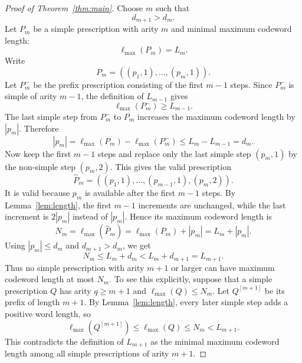 \documentclass[10pt,a4paper]{amsart}
\newcommand{\ellmax}{\ell_{\max}}
\begin{document}
\begin{proof}[Proof of Theorem~\ref{thm:main}]
Choose $m$ such that
\begin{equation}
d_{m+1}>d_m.
\end{equation}
Let $P_m$ be a simple prescription with arity $m$ and minimal maximum codeword length:
\begin{equation}
\ellmax(P_m)=L_m.
\end{equation}
Write
\begin{equation}
P_m=((p_1,1),\ldots,(p_m,1)).
\end{equation}
Let $P_m^-$ be the prefix prescription consisting of the first $m-1$ steps. Since $P_m^-$ is simple of arity $m-1$, the definition of $L_{m-1}$ gives
\begin{equation}
\ellmax(P_m^-)\geq L_{m-1}.
\end{equation}
The last simple step from $P_m^-$ to $P_m$ increases the maximum codeword length by $|p_m|$. Therefore
\begin{equation}
|p_m|=\ellmax(P_m)-\ellmax(P_m^-)
       \leq L_m-L_{m-1}=d_m.
\end{equation}
Now keep the first $m-1$ steps and replace only the last simple step $(p_m,1)$ by the non-simple step $(p_m,2)$. This gives the valid prescription
\begin{equation}
\widehat P_m=((p_1,1),\ldots,(p_{m-1},1),(p_m,2)).
\end{equation}
It is valid because $p_m$ is available after the first $m-1$ steps. By Lemma~\ref{lem:length}, the first $m-1$ increments are unchanged, while the last increment is $2|p_m|$ instead of $|p_m|$. Hence its maximum codeword length is
\begin{equation}
N_m=\ellmax(\widehat P_m)=\ellmax(P_m)+|p_m|=L_m+|p_m|.
\end{equation}
Using $|p_m|\leq d_m$ and $d_{m+1}>d_m$, we get
\begin{equation}
N_m\leq L_m+d_m<L_m+d_{m+1}=L_{m+1}.
\end{equation}
Thus no simple prescription with arity $m+1$ or larger can have maximum codeword length at most $N_m$. To see this explicitly, suppose that a simple prescription $Q$ has arity $q\geq m+1$ and $\ellmax(Q)\leq N_m$. Let $Q^{[m+1]}$ be its prefix of length $m+1$. By Lemma~\ref{lem:length}, every later simple step adds a positive word length, so
\begin{equation}
\ellmax(Q^{[m+1]})\leq \ellmax(Q)\leq N_m<L_{m+1}.
\end{equation}
This contradicts the definition of $L_{m+1}$ as the minimal maximum codeword length among all simple prescriptions of arity $m+1$.


\end{proof}
\end{document}
